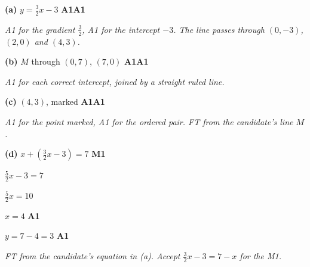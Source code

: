 \documentclass[12pt, twoside]{article}
\begin{document}
\begin{enumerate}[itemsep=0.3cm]
\begin{minipage}[t]{0.53\linewidth}
\vspace{0pt}
\end{minipage}
\hfill
\begin{minipage}[t]{0.45\linewidth}
\vspace{0pt}
\textbf{(a)} $y = \frac{3}{2}x - 3$ \hfill \textbf{A1A1}

\emph{A1 for the gradient $\frac{3}{2}$, A1 for the intercept $-3$. The
line passes through $(0, -3)$, $(2, 0)$ and $(4, 3)$.}

\textbf{(b)} $M$ through $(0, 7)$, $(7, 0)$ \hfill \textbf{A1A1}

\emph{A1 for each correct intercept, joined by a straight ruled line.}

\textbf{(c)} $(4, 3)$, marked \hfill \textbf{A1A1}

\emph{A1 for the point marked, A1 for the ordered pair. FT from the
candidate's line $M$.}
\end{minipage}

\medskip

\textbf{(d)} $x + \left(\frac{3}{2}x - 3\right) = 7$ \hfill \textbf{M1}

$\frac{5}{2}x - 3 = 7$

$\frac{5}{2}x = 10$

$x = 4$ \hfill \textbf{A1}

$y = 7 - 4 = 3$ \hfill \textbf{A1}

\emph{FT from the candidate's equation in (a). Accept $\frac{3}{2}x - 3 = 7 - x$
for the M1.}

\end{enumerate}
\end{document}

